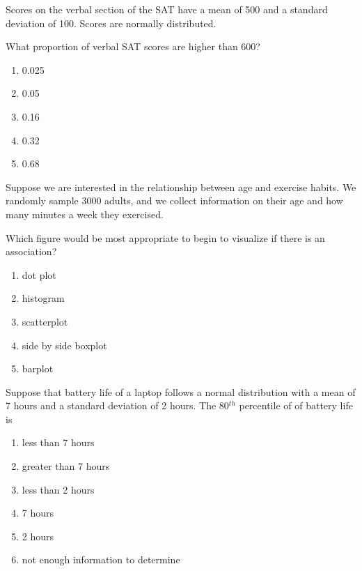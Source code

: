 \begin{frame}
Scores on the verbal section of the SAT have a mean of 500 and a standard deviation of 100. Scores are normally distributed.
\begin{clicker}
{What proportion of verbal SAT scores are higher than 600?}
\begin{enumerate}
    \item
    0.025
    \item
    0.05
    \item
    0.16
    \item
    0.32
    \item
    0.68
\end{enumerate}
\end{clicker}
\end{frame}




\begin{frame}
Suppose we are interested in the relationship between age and exercise habits.  We randomly sample 3000 adults, and we collect information on their age and how many minutes a week they exercised.
\begin{clicker}{Which figure would be most appropriate to begin to visualize if there is an association?}
    \begin{enumerate}
        \item
        dot plot
        \item
        histogram
        \item
        scatterplot
        \item
        side by side boxplot
        \item
        barplot
    \end{enumerate}
\end{clicker}
\end{frame}

\begin{frame}
\begin{clicker}{Suppose that battery life of a laptop follows a normal distribution with a mean of 7 hours and a standard deviation of 2 hours.  The 80$^{th}$ percentile of of battery life is}
\begin{enumerate}
    \item
    less than 7 hours
    \item
    greater than 7 hours
    \item
    less than 2 hours
    \item
    7 hours
    \item
    2 hours
    \item
    not enough information to determine
\end{enumerate}
\end{clicker}
\end{frame}


